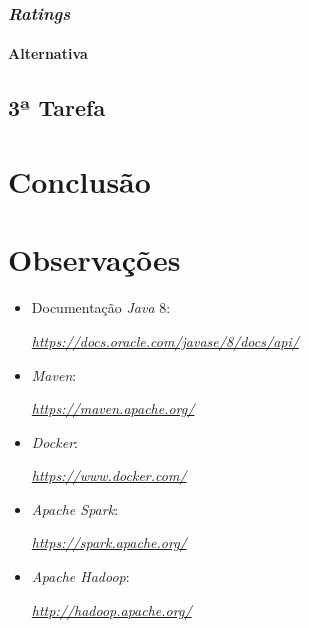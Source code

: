 \documentclass[a4paper]{report}
\begin{document}
        \subsection{\textit{Ratings}} \label{subsec:Task2-Ratings}
            \subsubsection{Alternativa} \label{sssec:Task2-Ratings-Alternativa}

    \section{3ª Tarefa} \label{sec:Task3}


\chapter{Conclusão} \label{ch:Conclusion}
\large{
    
}

\appendix
\chapter{Observações} \label{ch:Observations}
\begin{itemize}
    \item Documentação \textit{Java} 8:
    \par \textit{\url{https://docs.oracle.com/javase/8/docs/api/}}
    \item \textit{Maven}:
    \par \textit{\url{https://maven.apache.org/}}
    \item \textit{Docker}:
    \par \textit{\url{https://www.docker.com/}}
    \item \textit{Apache Spark}:
    \par \textit{\url{https://spark.apache.org/}}
    \item \textit{Apache Hadoop}:
    \par \textit{\url{http://hadoop.apache.org/}}
\end{itemize}
\end{document}
